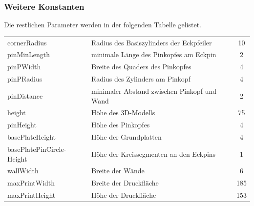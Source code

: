 \subsubsection{Weitere Konstanten}
Die restlichen Parameter werden in der folgenden Tabelle gelistet. \\
\begin{tabularx}{\textwidth}{|A|B|C|}
	\hline
	 &  &  \\ 
	\hline
	cornerRadius & Radius des Basiszylinders der Eckpfeiler & 10 \\ 
	\hline 
	pinMinLength & minimale Länge des Pinkopfes am Eckpin & 2 \\ 
	\hline 
	pinPWidth & Breite des Quaders des Pinkopfes & 4 \\ 
	\hline 
	pinPRadius & Radius des Zylinders am Pinkopf & 4 \\ 
	\hline 
	pinDistance & minimaler Abstand zwischen Pinkopf und Wand & 2 \\ 
	\hline 
	height & Höhe des 3D-Modells & 75 \\ 
	\hline 
	pinHeight & Höhe des Pinkopfes & 4 \\ 
	\hline 
	basePlateHeight & Höhe der Grundplatten & 4 \\ 
	\hline 
	basePlatePinCircle-\newline Height & Höhe der Kreissegmenten an den Eckpins & 1 \\
	\hline 
	wallWidth & Breite der Wände & 6 \\ 
	\hline 
	maxPrintWidth & Breite der Druckfläche & 185 \\ 
	\hline 
	maxPrintHeight & Höhe der Druckfläche & 153 \\  
	\hline
\end{tabularx}

